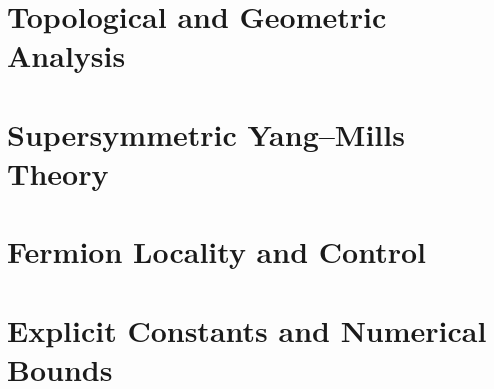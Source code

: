 \documentclass[11pt,a4paper]{report}
\begin{document}
\chapter{Topological and Geometric Analysis}
\label{ch:topological}






\chapter{Supersymmetric Yang--Mills Theory}
\label{ch:susy}






\chapter{Fermion Locality and Control}
\label{ch:fermions}




\chapter{Explicit Constants and Numerical Bounds}
\label{ch:constants}





\end{document}
